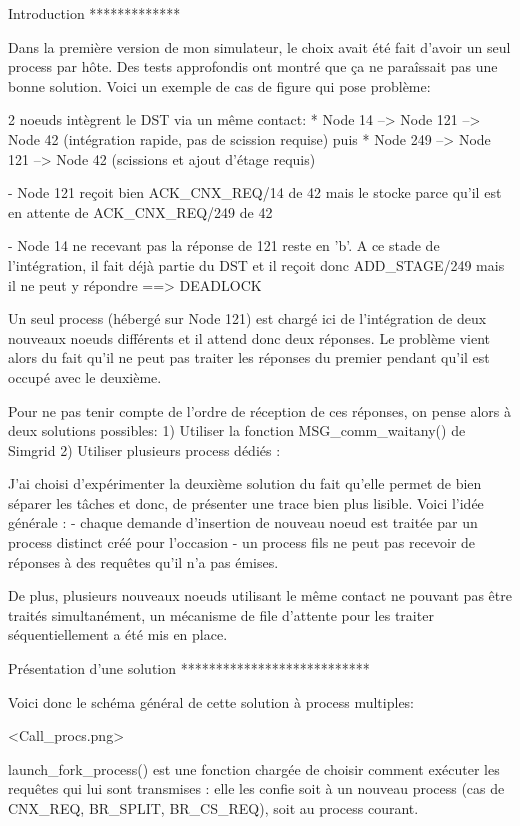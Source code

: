 Introduction
*************

Dans la première version de mon simulateur, le choix avait été fait d'avoir un seul process par hôte. Des tests
approfondis ont montré que ça ne paraîssait pas une bonne solution. Voici un exemple de cas de figure qui pose problème:

2 noeuds intègrent le DST via un même contact:
 * Node 14 --> Node 121 --> Node 42 (intégration rapide, pas de scission requise)
   puis
 * Node 249 --> Node 121 --> Node 42 (scissions et ajout d'étage requis)

 - Node 121 reçoit bien ACK_CNX_REQ/14 de 42 mais le stocke parce qu'il est en attente de ACK_CNX_REQ/249 de 42

 - Node 14 ne recevant pas la réponse de 121 reste en 'b'. A ce stade de l'intégration, il fait déjà partie du DST
   et il reçoit donc ADD_STAGE/249 mais il ne peut y répondre ==> DEADLOCK

Un seul process (hébergé sur Node 121) est chargé ici de l'intégration de deux nouveaux noeuds différents et il attend
donc deux réponses. Le problème vient alors du fait qu'il ne peut pas traiter les réponses du premier pendant qu'il est occupé avec le deuxième.

Pour ne pas tenir compte de l'ordre de réception de ces réponses, on pense alors à deux solutions possibles:
1) Utiliser la fonction MSG_comm_waitany() de Simgrid
2) Utiliser plusieurs process dédiés :

J'ai choisi d'expérimenter la deuxième solution du fait qu'elle permet de bien séparer les tâches et donc, de présenter une trace bien plus lisible.
Voici l'idée générale :
  - chaque demande d'insertion de nouveau noeud est traitée par un process distinct créé pour l'occasion
  - un process fils ne peut pas recevoir de réponses à des requêtes qu'il n'a pas émises.

De plus, plusieurs nouveaux noeuds utilisant le même contact ne pouvant pas être traités simultanément,
un mécanisme de file d'attente pour les traiter séquentiellement a été mis en place.

Présentation d'une solution
***************************

Voici donc le schéma général de cette solution à process multiples:

<Call_procs.png>

launch_fork_process() est une fonction chargée de choisir comment exécuter les requêtes qui lui sont transmises : elle
les confie soit à un nouveau process (cas de CNX_REQ, BR_SPLIT, BR_CS_REQ), soit au process courant.

